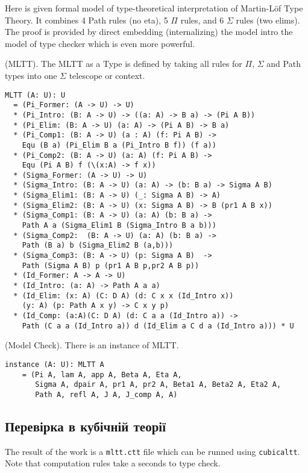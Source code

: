Here is given formal model of type-theoretical interpretation of Martin-Löf Type Theory.
It combines 4 Path rules (no eta), 5 $\Pi$ rules, and 6 $\Sigma$ rules (two elims).
The proof is provided by direct embedding (internalizing) the model intro the model
of type checker which is even more powerful.

\begin{definition} (MLTT).
The MLTT as a Type is defined by taking all rules
for $\Pi$, $\Sigma$ and Path types into one $\Sigma$ telescope or context.
\begin{lstlisting}
MLTT (A: U): U
  = (Pi_Former: (A -> U) -> U)
  * (Pi_Intro: (B: A -> U) -> ((a: A) -> B a) -> (Pi A B))
  * (Pi_Elim: (B: A -> U) (a: A) -> (Pi A B) -> B a)
  * (Pi_Comp1: (B: A -> U) (a : A) (f: Pi A B) ->
    Equ (B a) (Pi_Elim B a (Pi_Intro B f)) (f a))
  * (Pi_Comp2: (B: A -> U) (a: A) (f: Pi A B) ->
    Equ (Pi A B) f (\(x:A) -> f x))
  * (Sigma_Former: (A -> U) -> U)
  * (Sigma_Intro: (B: A -> U) (a: A) -> (b: B a) -> Sigma A B)
  * (Sigma_Elim1: (B: A -> U) (_: Sigma A B) -> A)
  * (Sigma_Elim2: (B: A -> U) (x: Sigma A B) -> B (pr1 A B x))
  * (Sigma_Comp1: (B: A -> U) (a: A) (b: B a) ->
    Path A a (Sigma_Elim1 B (Sigma_Intro B a b)))
  * (Sigma_Comp2:  (B: A -> U) (a: A) (b: B a) ->
    Path (B a) b (Sigma_Elim2 B (a,b)))
  * (Sigma_Comp3: (B: A -> U) (p: Sigma A B)  ->
    Path (Sigma A B) p (pr1 A B p,pr2 A B p))
  * (Id_Former: A -> A -> U)
  * (Id_Intro: (a: A) -> Path A a a)
  * (Id_Elim: (x: A) (C: D A) (d: C x x (Id_Intro x))
    (y: A) (p: Path A x y) -> C x y p)
  * (Id_Comp: (a:A)(C: D A) (d: C a a (Id_Intro a)) ->
    Path (C a a (Id_Intro a)) d (Id_Elim a C d a (Id_Intro a))) * U
\end{lstlisting}
\end{definition}

\begin{theorem} (Model Check).
There is an instance of MLTT.
\begin{lstlisting}
instance (A: U): MLTT A
    = (Pi A, lam A, app A, Beta A, Eta A,
       Sigma A, dpair A, pr1 A, pr2 A, Beta1 A, Beta2 A, Eta2 A,
       Path A, refl A, J A, J_comp A, A)
\end{lstlisting}
\end{theorem}

\subsection*{Перевірка в кубічній теорії}

The result of the work is a \lstinline{mltt.ctt} file which can be runned using \lstinline{cubicaltt}.
Note that computation rules take a seconds to type check.

